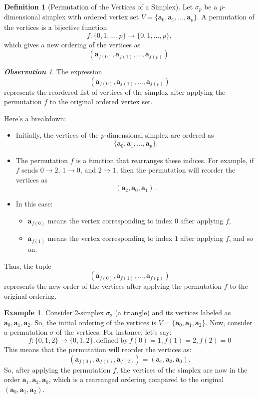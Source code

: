 \documentclass[12pt,oneside,reqno]{amsart}
\theoremstyle{plain}
\theoremstyle{definition}
\newtheorem{example}{Example}[section]
\newtheorem{definition}[theorem]{Definition}
\theoremstyle{remark}
\newtheorem{observation}[]{\textbf{Observation}}
\newcommand{\0}{{\textbf{0}}}
\begin{document}
\begin{definition}[Permutation of the Vertices of a Simplex]\label{d:Permutation of the Vertices of a Simplex}
Let $\sigma_p$ be a $p$-dimensional simplex with ordered vertex set
$V = \{\mathbf{a}_0, \mathbf{a}_1, \ldots, \mathbf{a}_p\}$. A permutation of the vertices is a bijective function
\[
f \colon \{0, 1, \ldots, p\} \to \{0, 1, \ldots, p\},
\]
which gives a new ordering of the vertices as
\[
(\mathbf{a}_{f(0)}, \mathbf{a}_{f(1)}, \ldots, \mathbf{a}_{f(p)}).
\]
\end{definition}

\begin{observation}
The expression
\[
(\mathbf{a}_{f(0)}, \mathbf{a}_{f(1)}, \ldots, \mathbf{a}_{f(p)})
\]
represents the reordered list of vertices of the simplex after applying the permutation $f$ to the original ordered vertex set.

Here’s a breakdown:
\begin{itemize}
    \item Initially, the vertices of the $p$-dimensional simplex are ordered as
    \[
    \{\mathbf{a}_0, \mathbf{a}_1, \ldots, \mathbf{a}_p\}.
    \]
    \item The permutation $f$ is a function that rearranges these indices. For example, if $f$ sends $0 \to 2$, $1 \to 0$, and $2 \to 1$, then the permutation will reorder the vertices as
    \[
    (\mathbf{a}_2, \mathbf{a}_0, \mathbf{a}_1).
    \]
    \item In this case:
    \begin{itemize}
        \item $\mathbf{a}_{f(0)}$ means the vertex corresponding to index $0$ after applying $f$,
        \item $\mathbf{a}_{f(1)}$ means the vertex corresponding to index $1$ after applying $f$, and so on.
    \end{itemize}
\end{itemize}

Thus, the tuple
\[
(\mathbf{a}_{f(0)}, \mathbf{a}_{f(1)}, \ldots, \mathbf{a}_{f(p)})
\]
represents the new order of the vertices after applying the permutation $f$ to the original ordering.
\end{observation}

\begin{example}
Consider 2-simplex $\sigma_2$ (a triangle) and its vertices labeled as $\mathbf{a}_0, \mathbf{a}_1, \mathbf{a}_2$. So, the initial ordering of the vertices is $V = \{\mathbf{a}_0, \mathbf{a}_1, \mathbf{a}_2\}$. Now, consider a permutation $\sigma$ of the vertices. For instance, let’s say:
\[
f \colon \{0, 1, 2\} \to \{0, 1, 2\}, \text{defined by} \, f(0) = 1, f(1) = 2, f(2) = 0\]
This means that the permutation will reorder the vertices as:
\[
(\mathbf{a}_{f(0)}, \mathbf{a}_{f(1)}, \mathbf{a}_{f(2)}) = (\mathbf{a}_1, \mathbf{a}_2, \mathbf{a}_0).
\]
So, after applying the permutation $f$, the vertices of the simplex are now in the order $\mathbf{a}_1, \mathbf{a}_2, \mathbf{a}_0$, which is a rearranged ordering compared to the original $(\mathbf{a}_0, \mathbf{a}_1, \mathbf{a}_2)$.
\end{example}
\end{document}

